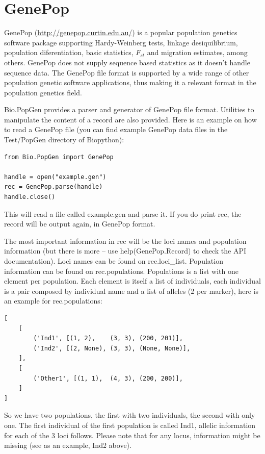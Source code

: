 \documentclass{report}
\begin{document}
\section{GenePop}

GenePop (\url{http://genepop.curtin.edu.au/}) is a popular population
genetics software package supporting Hardy-Weinberg tests, linkage
desiquilibrium, population diferentiation, basic statistics, $F_{st}$ and
migration estimates, among others. GenePop does not supply sequence
based statistics as it doesn't handle sequence data.
The GenePop file format is supported by a wide range of other population
genetic software applications, thus making it a relevant format in the
population genetics field.

Bio.PopGen provides a parser and generator of GenePop file format.
Utilities to manipulate the content of a record are also provided.
Here is an example on how to read a GenePop file (you can find
example GenePop data files in the Test/PopGen directory of Biopython):

\begin{verbatim}
from Bio.PopGen import GenePop

handle = open("example.gen")
rec = GenePop.parse(handle)
handle.close()
\end{verbatim}

This will read a file called example.gen and parse it. If you
do print rec, the record will be output again, in GenePop format.

The most important information in rec will be the loci names and
population information (but there is more -- use help(GenePop.Record)
to check the API documentation). Loci names can be found on rec.loci\_list.
Population information can be found on rec.populations.
Populations is a list with one element per population. Each element is itself
a list of individuals, each individual is a pair composed by individual
name and a list of alleles (2 per marker), here is an example for
rec.populations:

\begin{verbatim}
[
    [
        ('Ind1', [(1, 2),    (3, 3), (200, 201)],
        ('Ind2', [(2, None), (3, 3), (None, None)],
    ],
    [
        ('Other1', [(1, 1),  (4, 3), (200, 200)],
    ]
]
\end{verbatim}

So we have two populations, the first with two individuals, the
second with only one. The first individual of the first
population is called Ind1, allelic information for each of
the 3 loci follows. Please note that for any locus, information
might be missing (see as an example, Ind2 above).
\end{document}
